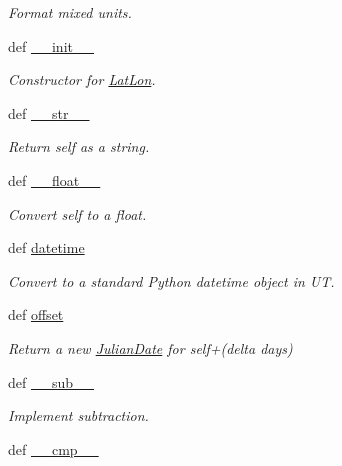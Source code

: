 \begin{DoxyCompactItemize}
\begin{DoxyCompactList}\small\item\em Format mixed units. \end{DoxyCompactList}\item 
def \hyperlink{namespaceamonpy_1_1sim_1_1sidereal__m_a2159885c957afafb8f99301627008fd7}{\-\_\-\-\_\-init\-\_\-\-\_\-}
\begin{DoxyCompactList}\small\item\em Constructor for \hyperlink{classamonpy_1_1sim_1_1sidereal__m_1_1_lat_lon}{Lat\-Lon}. \end{DoxyCompactList}\item 
def \hyperlink{namespaceamonpy_1_1sim_1_1sidereal__m_a08d5d6649a0a185d522b546fa3e04237}{\-\_\-\-\_\-str\-\_\-\-\_\-}
\begin{DoxyCompactList}\small\item\em Return self as a string. \end{DoxyCompactList}\item 
def \hyperlink{namespaceamonpy_1_1sim_1_1sidereal__m_a7f32f755507bdf87eb38af9dcfbe42ea}{\-\_\-\-\_\-float\-\_\-\-\_\-}
\begin{DoxyCompactList}\small\item\em Convert self to a float. \end{DoxyCompactList}\item 
def \hyperlink{namespaceamonpy_1_1sim_1_1sidereal__m_a102b49df2ddadac679bbe5e463ac504c}{datetime}
\begin{DoxyCompactList}\small\item\em Convert to a standard Python datetime object in U\-T. \end{DoxyCompactList}\item 
def \hyperlink{namespaceamonpy_1_1sim_1_1sidereal__m_aa3c638b4b8d6251276b9034f5bb290a0}{offset}
\begin{DoxyCompactList}\small\item\em Return a new \hyperlink{classamonpy_1_1sim_1_1sidereal__m_1_1_julian_date}{Julian\-Date} for self+(delta days) \end{DoxyCompactList}\item 
def \hyperlink{namespaceamonpy_1_1sim_1_1sidereal__m_a03742b573162310e69355a4c557dee29}{\-\_\-\-\_\-sub\-\_\-\-\_\-}
\begin{DoxyCompactList}\small\item\em Implement subtraction. \end{DoxyCompactList}\item 
def \hyperlink{namespaceamonpy_1_1sim_1_1sidereal__m_ab23028d01b4c161522fd674909cad7a8}{\-\_\-\-\_\-cmp\-\_\-\-\_\-}

\end{DoxyCompactItemize}
